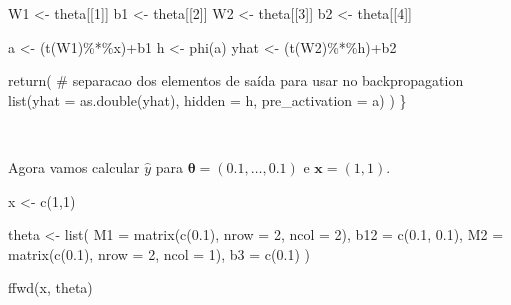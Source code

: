 \documentclass[
  a4paperpaper,
]{article}
\newenvironment{Shaded}{\begin{snugshade}}{\end{snugshade}}
\newcommand{\AttributeTok}[1]{\textcolor[rgb]{0.40,0.45,0.13}{#1}}
\newcommand{\CommentTok}[1]{\textcolor[rgb]{0.37,0.37,0.37}{#1}}
\newcommand{\DecValTok}[1]{\textcolor[rgb]{0.68,0.00,0.00}{#1}}
\newcommand{\FloatTok}[1]{\textcolor[rgb]{0.68,0.00,0.00}{#1}}
\newcommand{\FunctionTok}[1]{\textcolor[rgb]{0.28,0.35,0.67}{#1}}
\newcommand{\NormalTok}[1]{\textcolor[rgb]{0.00,0.23,0.31}{#1}}
\newcommand{\OtherTok}[1]{\textcolor[rgb]{0.00,0.23,0.31}{#1}}
\newcommand{\SpecialCharTok}[1]{\textcolor[rgb]{0.37,0.37,0.37}{#1}}
\begin{document}
\begin{Shaded}
\begin{Highlighting}[]
\NormalTok{  W1 }\OtherTok{\textless{}{-}}\NormalTok{ theta[[}\DecValTok{1}\NormalTok{]]}
\NormalTok{  b1 }\OtherTok{\textless{}{-}}\NormalTok{ theta[[}\DecValTok{2}\NormalTok{]]}
\NormalTok{  W2 }\OtherTok{\textless{}{-}}\NormalTok{ theta[[}\DecValTok{3}\NormalTok{]]}
\NormalTok{  b2 }\OtherTok{\textless{}{-}}\NormalTok{ theta[[}\DecValTok{4}\NormalTok{]]}
  
\NormalTok{  a }\OtherTok{\textless{}{-}}\NormalTok{ (}\FunctionTok{t}\NormalTok{(W1)}\SpecialCharTok{\%*\%}\NormalTok{x)}\SpecialCharTok{+}\NormalTok{b1}
\NormalTok{  h }\OtherTok{\textless{}{-}} \FunctionTok{phi}\NormalTok{(a)}
\NormalTok{  yhat }\OtherTok{\textless{}{-}}\NormalTok{ (}\FunctionTok{t}\NormalTok{(W2)}\SpecialCharTok{\%*\%}\NormalTok{h)}\SpecialCharTok{+}\NormalTok{b2}
  
  \FunctionTok{return}\NormalTok{( }\CommentTok{\# separacao dos elementos de saída para usar no backpropagation}
    \FunctionTok{list}\NormalTok{(}\AttributeTok{yhat =} \FunctionTok{as.double}\NormalTok{(yhat),}
         \AttributeTok{hidden =}\NormalTok{ h,}
         \AttributeTok{pre\_activation =}\NormalTok{ a)}
\NormalTok{  )}
\NormalTok{\}}
\end{Highlighting}
\end{Shaded}

~

Agora vamos calcular \(\hat{y}\) para
\(\boldsymbol{\theta} = (0.1, \dots , 0.1)\) e
\(\boldsymbol{x} = (1, 1)\).

\begin{Shaded}
\begin{Highlighting}[]
\NormalTok{x }\OtherTok{\textless{}{-}} \FunctionTok{c}\NormalTok{(}\DecValTok{1}\NormalTok{,}\DecValTok{1}\NormalTok{)}

\NormalTok{theta }\OtherTok{\textless{}{-}} \FunctionTok{list}\NormalTok{(}
  \AttributeTok{M1 =} \FunctionTok{matrix}\NormalTok{(}\FunctionTok{c}\NormalTok{(}\FloatTok{0.1}\NormalTok{), }\AttributeTok{nrow =} \DecValTok{2}\NormalTok{, }\AttributeTok{ncol =} \DecValTok{2}\NormalTok{), }
  \AttributeTok{b12 =} \FunctionTok{c}\NormalTok{(}\FloatTok{0.1}\NormalTok{, }\FloatTok{0.1}\NormalTok{), }
  \AttributeTok{M2 =} \FunctionTok{matrix}\NormalTok{(}\FunctionTok{c}\NormalTok{(}\FloatTok{0.1}\NormalTok{), }\AttributeTok{nrow =} \DecValTok{2}\NormalTok{, }\AttributeTok{ncol =} \DecValTok{1}\NormalTok{), }
  \AttributeTok{b3 =} \FunctionTok{c}\NormalTok{(}\FloatTok{0.1}\NormalTok{) }
\NormalTok{)}

\FunctionTok{ffwd}\NormalTok{(x, theta)}
\end{Highlighting}
\end{Shaded}
\end{document}
